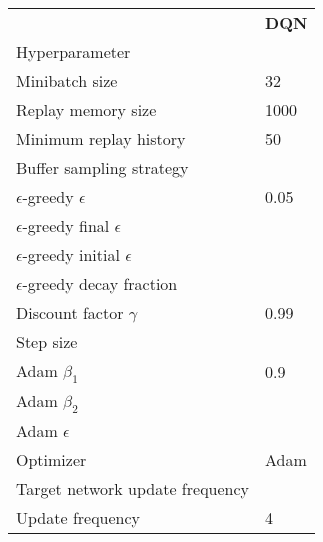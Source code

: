 \begin{tabular}{ll}
 & \bfseries DQN \\
Hyperparameter &  \\
Minibatch size & 32 \\
Replay memory size & 1000 \\
Minimum replay history & 50 \\
Buffer sampling strategy &  \\
$\epsilon$-greedy $\epsilon$ & 0.05 \\
$\epsilon$-greedy final $\epsilon$ &  \\
$\epsilon$-greedy initial $\epsilon$ &  \\
$\epsilon$-greedy decay fraction &  \\
Discount factor $\gamma$ & 0.99 \\
Step size &  \\
Adam $\beta_1$ & 0.9 \\
Adam $\beta_2$ &  \\
Adam $\epsilon$ &  \\
Optimizer & Adam \\
Target network update frequency &  \\
Update frequency & 4 \\
\end{tabular}
